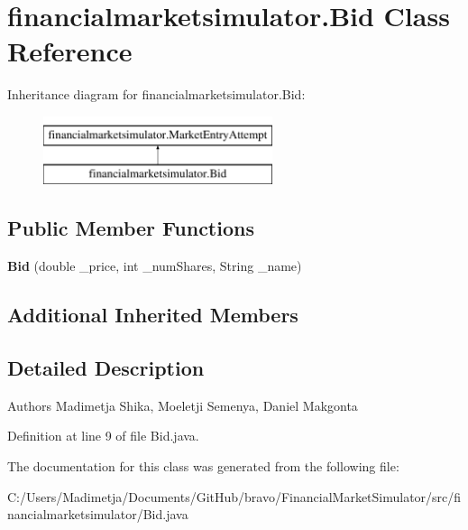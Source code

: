 \hypertarget{classfinancialmarketsimulator_1_1_bid}{\section{financialmarketsimulator.\+Bid Class Reference}
\label{classfinancialmarketsimulator_1_1_bid}
}
Inheritance diagram for financialmarketsimulator.\+Bid\+:\begin{figure}[H]
\begin{center}
\leavevmode
\includegraphics[height=2.000000cm]{classfinancialmarketsimulator_1_1_bid}
\end{center}
\end{figure}
\subsection*{Public Member Functions}
\begin{DoxyCompactItemize}
\item 
\hypertarget{classfinancialmarketsimulator_1_1_bid_a323008939bcfc7e51c56a9d61a1d79d9}{{\bfseries Bid} (double \+\_\+price, int \+\_\+num\+Shares, String \+\_\+name)}\label{classfinancialmarketsimulator_1_1_bid_a323008939bcfc7e51c56a9d61a1d79d9}

\end{DoxyCompactItemize}
\subsection*{Additional Inherited Members}


\subsection{Detailed Description}
\begin{DoxyAuthor}{Authors}
Madimetja Shika, Moeletji Semenya, Daniel Makgonta 
\end{DoxyAuthor}


Definition at line 9 of file Bid.\+java.



The documentation for this class was generated from the following file\+:\begin{DoxyCompactItemize}
\item 
C\+:/\+Users/\+Madimetja/\+Documents/\+Git\+Hub/bravo/\+Financial\+Market\+Simulator/src/financialmarketsimulator/Bid.\+java\end{DoxyCompactItemize}
